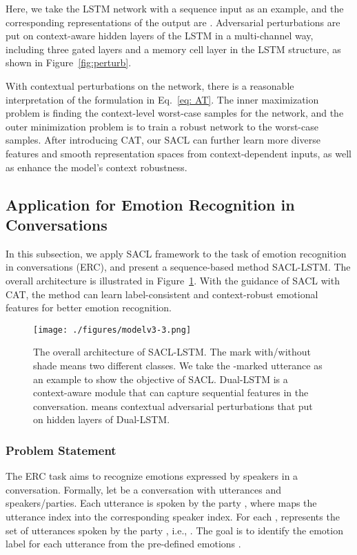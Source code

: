 \documentclass[11pt]{article}
\begin{document}
Here, we take the LSTM network \citep{DBLP:journals/neco/HochreiterS97} with a sequence input  as an example, and the corresponding representations of the output are .
Adversarial perturbations are put on context-aware hidden layers of the LSTM in a multi-channel way, including three gated layers and a memory cell layer in the LSTM structure, as shown in Figure~{\ref{fig:perturb}}.

With contextual perturbations on the network, there is a reasonable interpretation of the formulation in Eq.~\eqref{eq: AT}.
The inner maximization problem is finding the context-level worst-case samples for the network, and the outer minimization problem is to train a robust network to the worst-case samples.
After introducing CAT, our SACL can further learn more diverse features and smooth representation spaces from context-dependent inputs, as well as enhance the model's context robustness.

\subsection{Application for Emotion Recognition in Conversations}
In this subsection, we apply SACL framework to the task of emotion recognition in conversations (ERC), and present a sequence-based method SACL-LSTM. 
The overall architecture is illustrated in Figure~\ref{fig:model}.
With the guidance of SACL with CAT, the method can learn label-consistent and context-robust emotional features for better emotion recognition.


\begin{figure}[t]
  \centering
    \texttt{[image: ./figures/modelv3-3.png]}
    \caption{
    The overall architecture of SACL-LSTM. 
    The mark with/without shade means two different classes. We take the -marked utterance as an example to show the objective of SACL.
    Dual-LSTM is a context-aware module that can capture sequential features in the conversation. 
     means contextual adversarial perturbations that put on hidden layers of Dual-LSTM.
    }
  \label{fig:model}
\end{figure}


\subsubsection{Problem Statement}
The ERC task aims to recognize emotions expressed by speakers in a conversation. 
Formally, let  be a conversation with  utterances and  speakers/parties.
Each utterance  is spoken by the party , where  maps the utterance index into the corresponding speaker index.
For each ,  represents the set of utterances spoken by the party , i.e., .
The goal is to identify the emotion label  for each utterance  from the pre-defined emotions .
\end{document}
